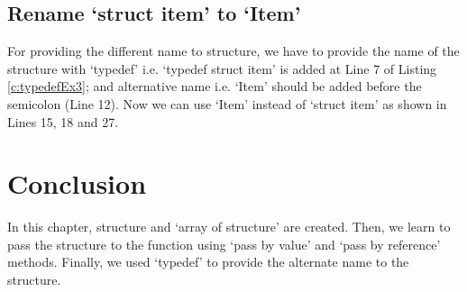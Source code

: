 

\subsection{Rename `struct item' to `Item'}\label{sec:aliasDiffName}
For providing the different name to structure, we have to provide the name of the structure with `typedef' i.e. `typedef struct item' is added at Line 7 of Listing \ref{c:typedefEx3}; and alternative name i.e. `Item' should be added before the semicolon (Line 12). Now we can use `Item' instead of `struct item' as shown in Lines 15, 18 and 27. 



\section{Conclusion}
In this chapter, structure and `array of structure' are created. Then, we learn to pass the structure to the function using `pass by value' and `pass by reference' methods. Finally, we used `typedef' to provide the alternate name to the structure. 

